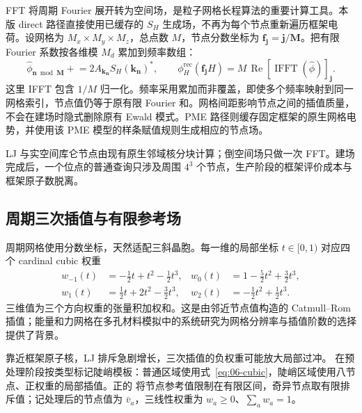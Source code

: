 FFT 将周期 Fourier 展开转为空间场，是粒子网格长程算法的重要计算工具\cite{darden1993}。本版 direct 路径直接使用已缓存的 $S_H$ 生成场，不再为每个节点重新遍历框架电荷。设网格为 $M_x\times M_y\times M_z$，总点数 $M$，节点分数坐标为 $\mathbf f_{\mathbf j}=\mathbf j/\mathbf M$。把有限 Fourier 系数按各维模 $M_d$ 累加到频率数组：
\begin{equation}
\widehat\phi_{\mathbf n\bmod\mathbf M}
\mathrel{+}=2A_{\mathbf k_{\mathbf n}}S_H(\mathbf k_{\mathbf n})^*,\qquad
\phi_H^{\mathrm{rec}}(\mathbf f_{\mathbf j}H)
=M\,\operatorname{Re}\!\left[\operatorname{IFFT}(\widehat\phi)\right]_{\mathbf j}.
\label{eq:06-host-fft}
\end{equation}
这里 IFFT 包含 $1/M$ 归一化。频率采用累加而非覆盖，即使多个频率映射到同一网格索引，节点值仍等于原有限 Fourier 和。网格间距影响节点之间的插值质量，不会在建场时隐式删除原有 Ewald 模式。PME 路径则缓存固定框架的原生网格电势，并使用该 PME 模型的样条赋值规则生成相应的节点场。

LJ 与实空间库仑节点由现有原生邻域核分块计算；倒空间场只做一次 FFT。建场完成后，一个位点的普通查询只涉及周围 $4^3$ 个节点，生产阶段的框架评价成本与框架原子数脱离。

\subsection{周期三次插值与有限参考场}

周期网格使用分数坐标，天然适配三斜晶胞。每一维的局部坐标 $t\in[0,1)$ 对应四个 cardinal cubic 权重
\begin{align}
w_{-1}(t)&=-\tfrac12t+t^2-\tfrac12t^3,&
w_0(t)&=1-\tfrac52t^2+\tfrac32t^3,\nonumber\\
w_1(t)&=\tfrac12t+2t^2-\tfrac32t^3,&
w_2(t)&=-\tfrac12t^2+\tfrac12t^3.
\label{eq:06-cubic}
\end{align}
三维值为三个方向权重的张量积加权和。这是由邻近节点值构造的 Catmull--Rom 插值；能量和力网格在多孔材料模拟中的系统研究为网格分辨率与插值阶数的选择提供了背景\cite{ran2025}。

靠近框架原子核，LJ 排斥急剧增长，三次插值的负权重可能放大局部过冲。 在预处理阶段按类型标记陡峭模板：普通区域使用式~\eqref{eq:06-cubic}，陡峭区域使用八节点、正权重的局部插值。正的  将节点参考值限制在有限区间，奇异节点取有限排斥值；记处理后的节点值为 $\bar v_a$，三线性权重为 $w_a\ge0$、$\sum_a w_a=1$。


